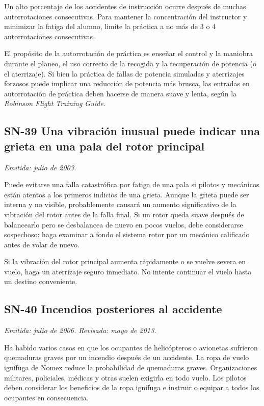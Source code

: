 Un alto porcentaje de los accidentes de instrucción ocurre después de muchas autorrotaciones consecutivas. Para mantener la concentración del instructor y minimizar la fatiga del alumno, limite la práctica a no más de 3 o 4 autorrotaciones consecutivas.

El propósito de la autorrotación de práctica es enseñar el control y la maniobra durante el planeo, el uso correcto de la recogida y la recuperación de potencia (o el aterrizaje). Si bien la práctica de fallas de potencia simuladas y aterrizajes forzosos puede implicar una reducción de potencia más brusca, las entradas en autorrotación de práctica deben hacerse de manera suave y lenta, según la \emph{Robinson Flight Training Guide}.

\subsection*{SN-39 \quad Una vibración inusual puede indicar una grieta en una pala del rotor principal}
{\small\textit{Emitida: julio de 2003.}}

Puede evitarse una falla catastrófica por fatiga de una pala si pilotos y mecánicos están atentos a los primeros indicios de una grieta. Aunque la grieta puede ser interna y no visible, probablemente causará un aumento significativo de la vibración del rotor antes de la falla final. Si un rotor queda suave después de balancearlo pero se desbalancea de nuevo en pocos vuelos, debe considerarse sospechoso: haga examinar a fondo el sistema rotor por un mecánico calificado antes de volar de nuevo.

Si la vibración del rotor principal aumenta rápidamente o se vuelve severa en vuelo, haga un aterrizaje seguro inmediato. No intente continuar el vuelo hasta un destino conveniente.

\subsection*{SN-40 \quad Incendios posteriores al accidente}
{\small\textit{Emitida: julio de 2006. Revisada: mayo de 2013.}}

Ha habido varios casos en que los ocupantes de helicópteros o avionetas sufrieron quemaduras graves por un incendio después de un accidente. La ropa de vuelo ignífuga de Nomex reduce la probabilidad de quemaduras graves. Organizaciones militares, policiales, médicas y otras suelen exigirla en todo vuelo. Los pilotos deben considerar los beneficios de la ropa ignífuga e instruir o equipar a todos los ocupantes en consecuencia.

